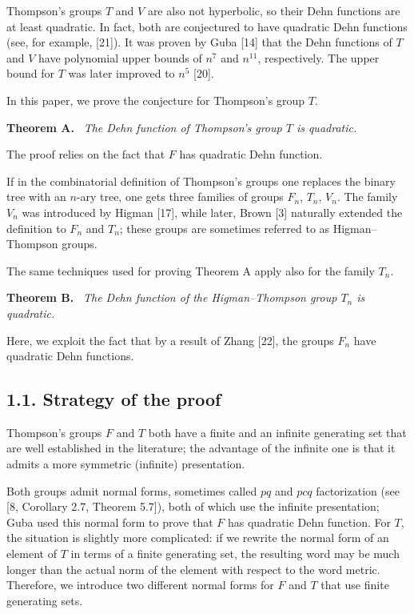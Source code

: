 \documentclass[10pt,a4paper]{article}
\newcommand{\sourcepagenumber}{editorial cover}
\newcommand{\SourcePage}[1]{\clearpage\gdef\sourcepagenumber{#1}}
\newenvironment{authorstatement}[1]{\par\medskip\noindent\textbf{#1}\ \itshape}{\par\medskip}
\begin{document}
Thompson's groups $T$ and $V$ are also not hyperbolic, so their Dehn functions are at least quadratic. In fact, both are conjectured to have quadratic Dehn functions (see, for example, [21]). It was proven by Guba [14] that the Dehn functions of $T$ and $V$ have polynomial upper bounds of $n^7$ and $n^{11}$, respectively. The upper bound for $T$ was later improved to $n^5$ [20].

In this paper, we prove the conjecture for Thompson's group $T$.

\SourcePage{2}
\begin{authorstatement}{Theorem A.}
The Dehn function of Thompson's group $T$ is quadratic.
\end{authorstatement}
The proof relies on the fact that $F$ has quadratic Dehn function.

If in the combinatorial definition of Thompson's groups one replaces the binary tree with an $n$-ary tree, one gets three families of groups $F_n$, $T_n$, $V_n$. The family $V_n$ was introduced by Higman [17], while later, Brown [3] naturally extended the definition to $F_n$ and $T_n$; these groups are sometimes referred to as Higman--Thompson groups.

The same techniques used for proving Theorem A apply also for the family $T_n$.
\begin{authorstatement}{Theorem B.}
The Dehn function of the Higman--Thompson group $T_n$ is quadratic.
\end{authorstatement}
Here, we exploit the fact that by a result of Zhang [22], the groups $F_n$ have quadratic Dehn functions.

\subsection*{1.1. Strategy of the proof}
Thompson's groups $F$ and $T$ both have a finite and an infinite generating set that are well established in the literature; the advantage of the infinite one is that it admits a more symmetric (infinite) presentation.

Both groups admit normal forms, sometimes called $pq$ and $pcq$ factorization (see [8, Corollary 2.7, Theorem 5.7]), both of which use the infinite presentation; Guba used this normal form to prove that $F$ has quadratic Dehn function. For $T$, the situation is slightly more complicated: if we rewrite the normal form of an element of $T$ in terms of a finite generating set, the resulting word may be much longer than the actual norm of the element with respect to the word metric. Therefore, we introduce two different normal forms for $F$ and $T$ that use finite generating sets.
\end{document}
